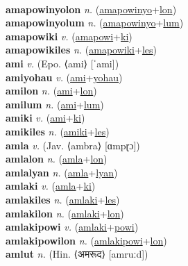  \label{amapowinyo} \\
\textbf{amapowinyolon} \textit{n.} (\hyperref[amapowinyo]{amapowinyo}+\hyperref[lon]{lon})
 \label{amapowinyolon} \\
\textbf{amapowinyolum} \textit{n.} (\hyperref[amapowinyo]{amapowinyo}+\hyperref[lum]{lum})
 \label{amapowinyolum} \\
\textbf{amapowiki} \textit{v.} (\hyperref[amapowi]{amapowi}+\hyperref[ki]{ki})
 \label{amapowiki} \\
\textbf{amapowikiles} \textit{n.} (\hyperref[amapowiki]{amapowiki}+\hyperref[les]{les})
 \label{amapowikiles} \\
\textbf{ami} \textit{v.} (Epo. ⟨ami⟩ [ˈami])
 \label{ami} \\
\textbf{amiyohau} \textit{v.} (\hyperref[ami]{ami}+\hyperref[yohau]{yohau})
 \label{amiyohau} \\
\textbf{amilon} \textit{n.} (\hyperref[ami]{ami}+\hyperref[lon]{lon})
 \label{amilon} \\
\textbf{amilum} \textit{n.} (\hyperref[ami]{ami}+\hyperref[lum]{lum})
 \label{amilum} \\
\textbf{amiki} \textit{v.} (\hyperref[ami]{ami}+\hyperref[ki]{ki})
 \label{amiki} \\
\textbf{amikiles} \textit{n.} (\hyperref[amiki]{amiki}+\hyperref[les]{les})
 \label{amikiles} \\
\textbf{amla} \textit{v.} (Jav. ⟨ambra⟩ [ɑmpɽɔ])
 \label{amla} \\
\textbf{amlalon} \textit{n.} (\hyperref[amla]{amla}+\hyperref[lon]{lon})
 \label{amlalon} \\
\textbf{amlalyan} \textit{n.} (\hyperref[amla]{amla}+\hyperref[lyan]{lyan})
 \label{amlalyan} \\
\textbf{amlaki} \textit{v.} (\hyperref[amla]{amla}+\hyperref[ki]{ki})
 \label{amlaki} \\
\textbf{amlakiles} \textit{n.} (\hyperref[amlaki]{amlaki}+\hyperref[les]{les})
 \label{amlakiles} \\
\textbf{amlakilon} \textit{n.} (\hyperref[amlaki]{amlaki}+\hyperref[lon]{lon})
 \label{amlakilon} \\
\textbf{amlakipowi} \textit{v.} (\hyperref[amlaki]{amlaki}+\hyperref[powi]{powi})
 \label{amlakipowi} \\
\textbf{amlakipowilon} \textit{n.} (\hyperref[amlakipowi]{amlakipowi}+\hyperref[lon]{lon})
 \label{amlakipowilon} \\
\textbf{amlut} \textit{n.} (Hin. ⟨अमरूद⟩ [amruːd])
 \label{amlut} \\

